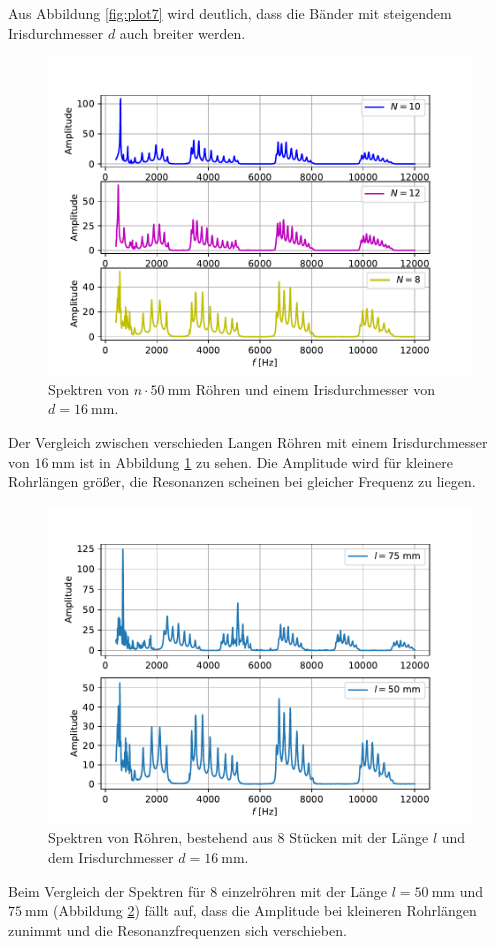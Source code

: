 Aus Abbildung \ref{fig:plot7} wird deutlich, dass die Bänder mit steigendem Irisdurchmesser $d$ auch breiter werden.
\begin{figure}
  \centering
  \includegraphics[scale=0.5]{Messwerte/plot8.pdf}
  \caption{Spektren von $n\cdot\SI{50}{\milli\meter}$ Röhren und einem Irisdurchmesser von $d=\SI{16}{\milli\meter}$.}
  \label{fig:plot8}
\end{figure}
Der Vergleich zwischen verschieden Langen Röhren mit einem Irisdurchmesser von $\SI{16}{\milli\meter}$ ist in Abbildung \ref{fig:plot8} zu sehen.
Die Amplitude wird für kleinere Rohrlängen größer, die Resonanzen scheinen bei gleicher Frequenz zu liegen.
\begin{figure}
  \centering
  \includegraphics[scale=0.5]{Messwerte/plot9.pdf}
  \caption{Spektren von Röhren, bestehend aus $8$ Stücken mit der Länge $l$ und dem Irisdurchmesser $d=\SI{16}{\milli\meter}$.}
  \label{fig:plot9}
\end{figure}
Beim Vergleich der Spektren für $8$ einzelröhren mit der Länge $l=\SI{50}{\milli\meter}$ und $\SI{75}{\milli\meter}$ (Abbildung \ref{fig:plot9}) fällt auf, dass die
Amplitude bei kleineren Rohrlängen zunimmt und die Resonanzfrequenzen sich verschieben.
